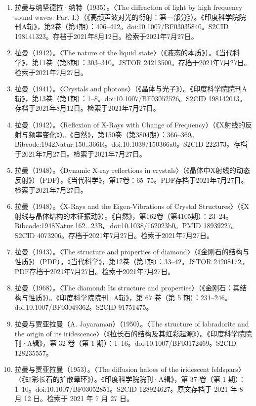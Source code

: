 \begin{enumerate}
\item 拉曼与纳坚德拉·纳特（1935）。〈The diffraction of light by high frequency sound waves: Part I.〉（《高频声波对光的衍射：第一部分》）。《印度科学院院刊A辑》，第2卷（第4期）：406–412。doi:10.1007/BF03035840。S2CID 198141323。存档于2021年8月12日。检索于2021年7月27日。
\item 拉曼（1942）。〈The nature of the liquid state〉（《液态的本质》）。《当代科学》，第11卷（第8期）：303–310。JSTOR 24213500。存档于2021年7月27日。检索于2021年7月27日。
\item 拉曼（1941）。〈Crystals and photons〉（《晶体与光子》）。《印度科学院院刊A辑》，第13卷（第1期）：1–8。doi:10.1007/BF03052526。S2CID 198142013。存档于2021年8月12日。检索于2021年7月27日。
\item 拉曼（1942）。〈Reflexion of X-Rays with Change of Frequency〉（《X射线的反射与频率变化》）。《自然》，第150卷（第3804期）：366–369。Bibcode:1942Natur.150..366R。doi:10.1038/150366a0。S2CID 222373。存档于2021年7月27日。检索于2021年7月27日。
\item 拉曼（1948）。〈Dynamic X-ray reflections in crystals〉（《晶体中X射线的动态反射》）（PDF）。《当代科学》，第17卷：65–75。PDF存档于2021年7月27日。检索于2021年7月27日。
\item 拉曼（1948）。〈X-Rays and the Eigen-Vibrations of Crystal Structures〉（《X射线与晶体结构的本征振动》）。《自然》，第162卷（第4105期）：23–24。Bibcode:1948Natur.162...23R。doi:10.1038/162023b0。PMID 18939227。S2CID 4073206。存档于2021年7月27日。检索于2021年7月27日。
\item 拉曼（1943）。〈The structure and properties of diamond〉（《金刚石的结构与性质》）（PDF）。《当代科学》，第12卷（第1期）：33–42。JSTOR 24208172。PDF存档于2021年7月27日。检索于2021年7月27日。
\item 拉曼（1968）。〈The diamond: Its structure and properties〉（《金刚石：其结构与性质》）。《印度科学院院刊·A辑》，第 67 卷（第 5 期）：231–246。doi:10.1007/BF03049362。S2CID 91751475。
\item 拉曼与贾亚拉曼（A. Jayaraman）（1950）。〈The structure of labradorite and the origin of its iridescence〉（《拉长石的结构及其虹彩起源》）。《印度科学院院刊·A辑》，第 32 卷（第 1 期）：1–16。doi:10.1007/BF03172469。S2CID 128235557。
\item 拉曼与贾亚拉曼（1953）。〈The diffusion haloes of the iridescent feldspars〉（《虹彩长石的扩散晕环》）。《印度科学院院刊·A辑》，第 37 卷（第 1 期）：1–10。doi:10.1007/BF03052851。S2CID 128924627。原文存档于 2021 年 8 月 12 日。检索于 2021 年 7 月 27 日。

\end{enumerate}
